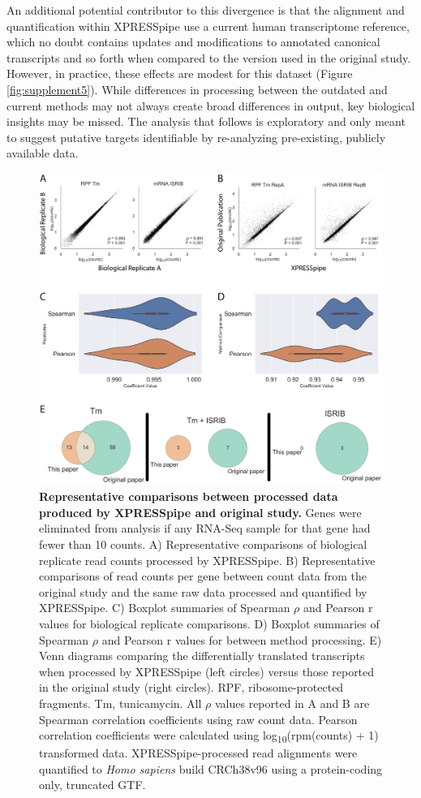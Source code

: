 \documentclass[10pt, oneside]{article}
\begin{document}
An additional potential contributor to this divergence is that the alignment and quantification within XPRESSpipe use a current human transcriptome reference, which no doubt contains updates and modifications to annotated canonical transcripts and so forth when compared to the version used in the original study. However, in practice, these effects are modest for this dataset (Figure \ref{fig:supplement5}). While differences in processing between the outdated and current methods may not always create broad differences in output, key biological insights may be missed. The analysis that follows is exploratory and only meant to suggest putative targets identifiable by re-analyzing pre-existing, publicly available data.\par

\begin{figure}
\centering
  \includegraphics[width=145mm]{figures/xpresspipe_figure2.png}
  \caption{\textbf{Representative comparisons between processed data produced by XPRESSpipe and original study.} Genes were eliminated from analysis if any RNA-Seq sample for that gene had fewer than 10 counts. A) Representative comparisons of biological replicate read counts processed by XPRESSpipe. B) Representative comparisons of read counts per gene between count data from the original study and the same raw data processed and quantified by XPRESSpipe. C) Boxplot summaries of Spearman $\rho$ and Pearson r values for biological replicate comparisons. D) Boxplot summaries of Spearman $\rho$ and Pearson r values for between method processing. E) Venn diagrams comparing the differentially translated transcripts when processed by XPRESSpipe (left circles) versus those reported in the original study (right circles). RPF, ribosome-protected fragments. Tm, tunicamycin. All $\rho$ values reported in A and B are Spearman correlation coefficients using raw count data. Pearson correlation coefficients were calculated using log\textsubscript{10}(rpm(counts) + 1) transformed data. XPRESSpipe-processed read alignments were quantified to \textit{Homo sapiens} build CRCh38v96 using a protein-coding only, truncated GTF.}
  \label{fig:figure2}
\end{figure}
\end{document}
